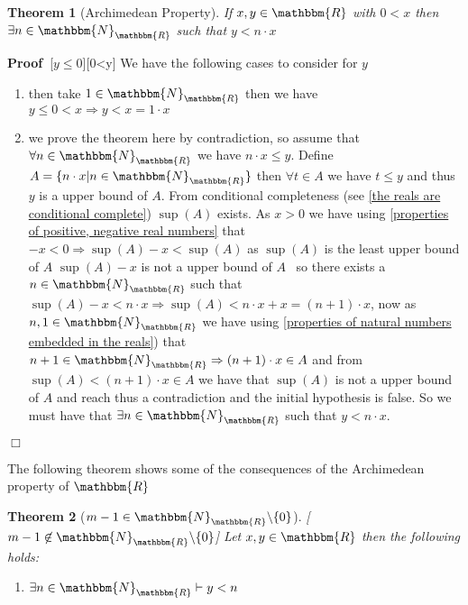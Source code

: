 \documentclass{book}
\newcommand{\nin}{\not\in}
\newcommand{\nobracket}{}
\newcommand{\um}{-}
\newcommand{\upl}{+}
\newenvironment{proof}{\noindent\textbf{Proof\ }}{\hspace*{\fill}$\Box$\medskip}
\newtheorem{theorem}{Theorem}
\begin{document}
{{\begin{theorem}[Archimedean Property]
  \label{archimedean property of the reals}If $x, y \in \mathbbm{R}$ with $0 <
  x$ then $\exists n \in \mathbbm{N}_{\mathbbm{R}}$ such that $y < n \cdot x$
\end{theorem}

\begin{proof}[$y \leqslant 0$][0<y]
  We have the following cases to consider for $y$
  \begin{enumerate}
    \item  then take $1 \in \mathbbm{N}_{\mathbbm{R}}$ then we have $y
    \leqslant 0 < x \Rightarrow y < x = 1 \cdot x$
    
    \item  we prove the theorem here by contradiction, so assume that $\forall
    n \in \mathbbm{N}_{\mathbbm{R}}$ we have $n \cdot x \leqslant y$. Define
    $A = \{ n \cdot x | n \in \mathbbm{N}_{\mathbbm{R}} \nobracket \}$ then
    $\forall t \in A$ we have $t \leqslant y$ and thus $y$ is a upper bound of
    $A$. From conditional completeness (see \ref{the reals are conditional
    complete}) $\sup (A)$ exists. As $x > 0$ we have using \ref{properties of
    positive, negative real numbers} that $- x < 0 \Rightarrow \sup (A) \um x
    < \sup (A)$ as $\sup (A)$ is the least upper bound of $A$ $\sup (A) \um x$
    is not a upper bound of $A$ \ so there exists a $n \in
    \mathbbm{N}_{\mathbbm{R}}$ such that $\sup (A) \um x < n \cdot x
    \Rightarrow \sup (A) < n \cdot x \upl x = (n \upl 1) \cdot x$, now as $n,
    1 \in \mathbbm{N}_{\mathbbm{R}}$ we have using \ref{properties of natural
    numbers embedded in the reals}) that $n \upl 1 \in
    \mathbbm{N}_{\mathbbm{R}} \Rightarrow (n \upl 1) \cdot x \in A$ and from
    $\sup (A) < (n \upl 1) \cdot x \in A$ we have that $\sup (A)$ is not a
    upper bound of $A$ and reach thus a contradiction and the initial
    hypothesis is false. So we must have that $\exists n \in
    \mathbbm{N}_{\mathbbm{R}}$ such that $y < n \cdot x$.
  \end{enumerate}
\end{proof}

The following theorem shows some of the consequences of the Archimedean
property of $\mathbbm{R}$

\begin{theorem}[$m \um 1 \in \mathbbm{N}_{\mathbbm{R}} \backslash \{ 0 \}$][$m
\um 1 \nin \mathbbm{N}_{\mathbbm{R}} \backslash \{ 0 \}$]
  \label{consequence of the archimedean property for the reals}Let $x, y \in
  \mathbbm{R}$ then the following holds:
  \begin{enumerate}
    \item $\exists n \in \mathbbm{N}_{\mathbbm{R}} \vdash y < n$
    

\end{enumerate}
\end{theorem}}}
\end{document}
